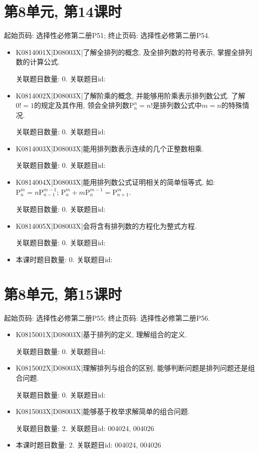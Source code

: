 \section*{第8单元, 第14课时}
起始页码: 选择性必修第二册P51; 终止页码: 选择性必修第二册P54.
\begin{itemize}
\item K0814001X|D08003X|了解全排列的概念, 及全排列数的符号表示, 掌握全排列数的计算公式.

关联题目数量: 0. 关联题目id: 

\item K0814002X|D08003X|了解阶乘的概念, 并能够用阶乘表示排列数公式. 了解$0!=1$的规定及其作用, 领会全排列数$\mathrm{P}_n^n=n!$是排列数公式中$m=n$的特殊情况.

关联题目数量: 0. 关联题目id: 

\item K0814003X|D08003X|能用排列数表示连续的几个正整数相乘.

关联题目数量: 0. 关联题目id: 

\item K0814004X|D08003X|能用排列数公式证明相关的简单恒等式, 如: $\mathrm{P}_n^m=n\mathrm{P}_{n-1}^{m-1}$; $\mathrm{P}_n^m+m\mathrm{P}_n^{m-1}=\mathrm{P}_{n+1}^m$.

关联题目数量: 0. 关联题目id: 

\item K0814005X|D08003X|会将含有排列数的方程化为整式方程.

关联题目数量: 0. 关联题目id: 

\item 本课时题目数量: 0. 关联题目id: 

\end{itemize}

\section*{第8单元, 第15课时}
起始页码: 选择性必修第二册P55; 终止页码: 选择性必修第二册P56.
\begin{itemize}
\item K0815001X|D08003X|基于排列的定义, 理解组合的定义.

关联题目数量: 0. 关联题目id: 

\item K0815002X|D08003X|理解排列与组合的区别, 能够判断问题是排列问题还是组合问题.

关联题目数量: 0. 关联题目id: 

\item K0815003X|D08003X|能够基于枚举求解简单的组合问题.

关联题目数量: 2. 关联题目id: 004024, 004026

\item 本课时题目数量: 2. 关联题目id: 004024, 004026

\end{itemize}

